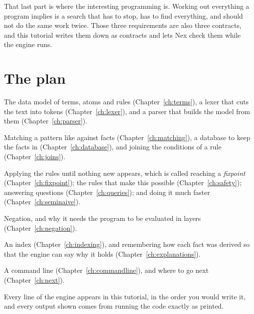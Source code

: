 That last part is where the interesting programming is. Working out
everything a program implies is a search that has to stop, has to find
everything, and should not do the same work twice. Those three
requirements are also three contracts, and this tutorial writes them down
as contracts and lets Nex check them while the engine runs.

\section{The plan}

\begin{description}[style=nextline, leftmargin=1.2em, itemsep=0.4em]
  \item[Reading Datalog.] The data model of terms, atoms and rules
    (Chapter~\ref{ch:terms}), a lexer that cuts the text into tokens
    (Chapter~\ref{ch:lexer}), and a parser that builds the model from them
    (Chapter~\ref{ch:parser}).
  \item[Facts and how rules use them.] Matching a pattern like
     against facts (Chapter~\ref{ch:matching}), a
    database to keep the facts in (Chapter~\ref{ch:database}), and joining
    the conditions of a rule (Chapter~\ref{ch:joins}).
  \item[Working out everything.] Applying the rules until nothing new
    appears, which is called reaching a \emph{fixpoint}
    (Chapter~\ref{ch:fixpoint}); the rules that make this possible
    (Chapter~\ref{ch:safety}); answering questions
    (Chapter~\ref{ch:queries}); and doing it much faster
    (Chapter~\ref{ch:seminaive}).
  \item[More expressive programs.] Negation, and why it needs the program
    to be evaluated in layers (Chapter~\ref{ch:negation}).
  \item[Speed and explanations.] An index (Chapter~\ref{ch:indexing}),
    and remembering how each fact was derived so that the engine can say
    why it holds (Chapter~\ref{ch:explanations}).
  \item[The finished program.] A command line (Chapter~\ref{ch:commandline}),
    and where to go next (Chapter~\ref{ch:next}).
\end{description}

Every line of the engine appears in this tutorial, in the order you would
write it, and every output shown comes from running the code exactly as
printed.
